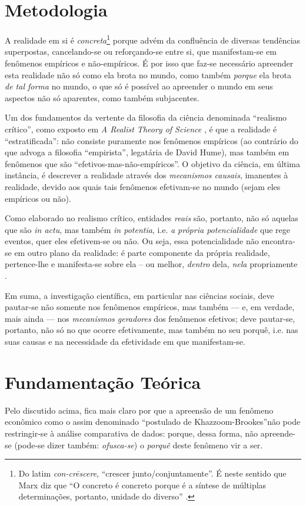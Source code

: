 \documentclass{article}[12pt]
\begin{document}
\section{Metodologia}
A realidade em si é \textit{concreta}\footnote{Do latim \textit{con-crēscere}, ``crescer junto/conjuntamente''. É neste sentido que Marx diz que ``O concreto é concreto porque é a síntese de múltiplas determinações, portanto, unidade do diverso'' \cite[p. 54]{Marx2021}.} porque advém da confluência de diversas tendências superpostas, cancelando-se ou reforçando-se entre si, que manifestam-se em fenômenos empíricos e não-empíricos. É por isso que faz-se necessário apreender esta realidade não só como ela brota no mundo, como também \textit{porque} ela brota \textit{de tal forma} no mundo, o que só é possível ao apreender o mundo em seus aspectos não só aparentes, como também subjacentes.

Um dos fundamentos da vertente da filosofia da ciência denominada ``realismo crítico'', como exposto em \textit{A Realist Theory of Science} \cite{Bhaskar1978}, é que a realidade é ``estratificada'': não consiste puramente nos fenômenos empíricos (ao contrário do que advoga a filosofia ``empirista'', legatária de David Hume), mas também em fenômenos que são ``efetivos-mas-não-empíricos''. O objetivo da ciência, em última instância, é descrever a realidade através dos \textit{mecanismos causais}, imanentes à realidade, devido aos quais tais fenômenos efetivam-se no mundo (sejam eles empíricos ou não). 

Como elaborado no realismo crítico, entidades \textit{reais} são, portanto, não só aquelas que são \textit{in actu}, mas também \textit{in potentia}, i.e. \textit{a própria potencialidade} que rege eventos, quer eles efetivem-se ou não. Ou seja, essa potencialidade não encontra-se em outro plano da realidade: é parte componente da própria realidade, pertence-lhe e manifesta-se sobre ela -- ou melhor, \textit{dentro} dela, \textit{nela} propriamente \cite{Bhaskar1978, Bhaskar1998, Lawson1997, Medeiros2013}.

Em suma, a investigação científica, em particular nas ciências sociais, deve pautar-se não somente nos fenômenos empíricos, mas também --- e, em verdade, mais ainda --- nos \textit{mecanismos geradores} dos fenômenos efetivos; deve pautar-se, portanto, não só no que ocorre efetivamente, mas também no seu porquê, i.e. nas suas causas e na necessidade da efetividade em que manifestam-se.

\section{Fundamentação Teórica}
Pelo discutido acima, fica mais claro por que a apreensão de um fenômeno econômico como o assim denominado ``postulado de Khazzoom-Brookes''não pode restringir-se à análise comparativa de dados: porque, dessa forma, não apreende-se (pode-se dizer também: \textit{ofusca-se}) o \textit{porquê} deste fenômeno vir a ser. 
\end{document}
